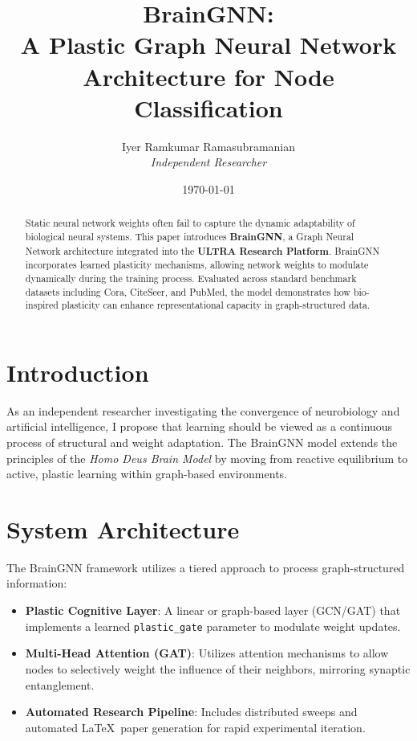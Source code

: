 \documentclass[12pt]{article}
\title{\textbf{BrainGNN: \\ A Plastic Graph Neural Network Architecture for Node Classification}}
\author{Iyer Ramkumar Ramasubramanian \\ \textit{Independent Researcher}}
\date{\today}
\begin{document}
\maketitle

\begin{abstract}
Static neural network weights often fail to capture the dynamic adaptability of biological neural systems. This paper introduces \textbf{BrainGNN}, a Graph Neural Network architecture integrated into the \textbf{ULTRA Research Platform}. BrainGNN incorporates learned plasticity mechanisms, allowing network weights to modulate dynamically during the training process. Evaluated across standard benchmark datasets including Cora, CiteSeer, and PubMed, the model demonstrates how bio-inspired plasticity can enhance representational capacity in graph-structured data.
\end{abstract}

\section{Introduction}
As an independent researcher investigating the convergence of neurobiology and artificial intelligence, I propose that learning should be viewed as a continuous process of structural and weight adaptation. The BrainGNN model extends the principles of the \textit{Homo Deus Brain Model} by moving from reactive equilibrium to active, plastic learning within graph-based environments.

\section{System Architecture}

The BrainGNN framework utilizes a tiered approach to process graph-structured information:

\begin{itemize}
\item \textbf{Plastic Cognitive Layer}: A linear or graph-based layer (GCN/GAT) that implements a learned \texttt{plastic\_gate} parameter to modulate weight updates.
\item \textbf{Multi-Head Attention (GAT)}: Utilizes attention mechanisms to allow nodes to selectively weight the influence of their neighbors, mirroring synaptic entanglement.
\item \textbf{Automated Research Pipeline}: Includes distributed sweeps and automated \LaTeX\ paper generation for rapid experimental iteration.
\end{itemize}
\end{document}
